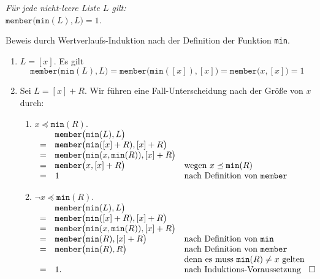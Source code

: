 \begin{Lemma} 
{\em
  F\"ur jede nicht-leere Liste $L$ gilt: \\[0.1cm]
  \hspace*{1.3cm} 
  $\mathtt{member}\bigl(\mathtt{min}(L), L\bigr) = 1$.
}
\end{Lemma}
Beweis durch Wertverlaufs-Induktion nach der Definition der Funktion \texttt{min}.
\begin{enumerate}
\item $L = [x]$.  Es gilt
      \[
        \mathtt{member}\bigl(\mathtt{min}(L), L\bigr)  = 
        \mathtt{member}\bigl(\mathtt{min}([x]), [x]\bigr) 
         =  \mathtt{member}\bigl(x, [x]\bigr) = 1
      \]
\item Sei $L = [x] + R$.  Wir f\"uhren eine Fall-Unterscheidung nach der Gr\"o{\ss}e von $x$
      durch:
      \begin{enumerate}
      \item $x \preceq \mathtt{min}(R)$. \\[0.1cm]
        \hspace*{1.3cm} 
      $
      \begin{array}[b]{cll}
        & \mathtt{member}\bigl( \mathtt{min}(L), L \bigr) \\
      = & \mathtt{member}\bigl( \mathtt{min}([x]+R), [x] + R \bigr) \\
      = & \mathtt{member}\bigl( \mathtt{min}(x,\mathtt{min}(R)), [x] + R \bigr) \\
      = & \mathtt{member}\bigl( x, [x] + R \bigr) & 
          \mbox{wegen $x \preceq \mathtt{min}(R)$} \\
      = & 1 & 
          \mbox{nach Definition von \texttt{member}} \\
      \end{array}
      $
      \item $\neg x \preceq \mathtt{min}(R)$. \\[0.1cm]
        \hspace*{1.3cm} 
      $
      \begin{array}[b]{cll}
        & \mathtt{member}\bigl( \mathtt{min}(L), L \bigr) \\
      = & \mathtt{member}\bigl( \mathtt{min}([x]+R), [x] + R \bigr) \\
      = & \mathtt{member}\bigl( \mathtt{min}(x,\mathtt{min}(R)), [x] + R \bigr) \\
      = & \mathtt{member}\bigl( \mathtt{min}(R), [x] + R \bigr) & 
          \mbox{nach Definition von \texttt{min}} \\
      = & \mathtt{member}\bigl( \mathtt{min}(R), R \bigr) & 
          \mbox{nach Definition von \texttt{member}} \\
        & & \mbox{denn es muss $\mathtt{min}(R) \not= x$ gelten} \\
      = & 1. & 
          \mbox{nach Induktions-Voraussetzung} 
      \end{array}\hspace*{\fill} \Box
      $
      \end{enumerate}
\end{enumerate}

